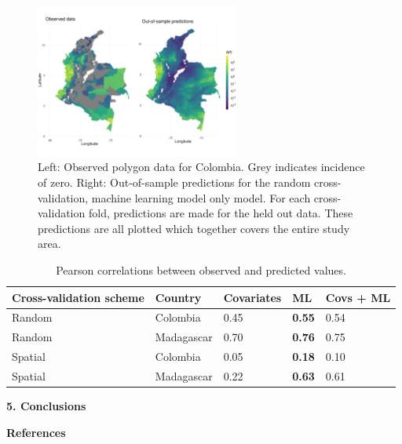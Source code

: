 \documentclass[11pt]{article}
\begin{document}
\begin{figure}
\centering
\includegraphics[trim={0 40mm 0 100mm}, width = 0.6\textwidth]{figs/col_obs_pred_map_ml.png} %
\caption{
  Left: Observed polygon data for Colombia. Grey indicates incidence of zero. Right: Out-of-sample predictions for the random cross-validation, machine learning model only model. For each cross-validation fold, predictions are made for the held out data. These predictions are all plotted which together covers the entire study area.
}
\label{randompredobspointfacet}
\end{figure}


\begin{table}
\caption{Pearson correlations between observed and predicted values. }
\centering
\begin{tabular}{lllll}
Cross-validation scheme & Country &  Covariates &  ML &  Covs + ML \\
\hline 
 Random &  Colombia &  0.45 &  \textbf{0.55} &  0.54 \\
 Random &  Madagascar &  0.70 &  \textbf{0.76} &  0.75 \\
 Spatial &  Colombia &  0.05 &  \textbf{0.18} &  0.10 \\
 Spatial &  Madagascar &  0.22 &  \textbf{0.63} &  0.61 
\end{tabular}
\label{t:results}
\end{table}



{\bf 5. Conclusions}




{\bf References}\\

 

\end{document}

